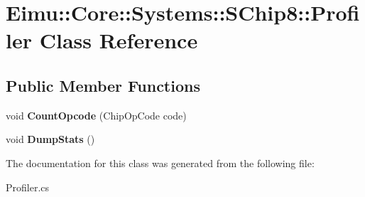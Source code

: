 \hypertarget{class_eimu_1_1_core_1_1_systems_1_1_s_chip8_1_1_profiler}{
\section{Eimu::Core::Systems::SChip8::Profiler Class Reference}
\label{class_eimu_1_1_core_1_1_systems_1_1_s_chip8_1_1_profiler}
}
\subsection*{Public Member Functions}
\begin{DoxyCompactItemize}
\item 
\hypertarget{class_eimu_1_1_core_1_1_systems_1_1_s_chip8_1_1_profiler_abc8350607941d16f16d4596f9496b105}{
void {\bfseries CountOpcode} (ChipOpCode code)}
\label{class_eimu_1_1_core_1_1_systems_1_1_s_chip8_1_1_profiler_abc8350607941d16f16d4596f9496b105}

\item 
\hypertarget{class_eimu_1_1_core_1_1_systems_1_1_s_chip8_1_1_profiler_a87a50f2696993d79f3048a33dd5dffe6}{
void {\bfseries DumpStats} ()}
\label{class_eimu_1_1_core_1_1_systems_1_1_s_chip8_1_1_profiler_a87a50f2696993d79f3048a33dd5dffe6}

\end{DoxyCompactItemize}


The documentation for this class was generated from the following file:\begin{DoxyCompactItemize}
\item 
Profiler.cs\end{DoxyCompactItemize}
